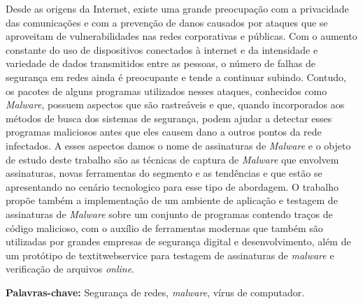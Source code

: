 \documentclass[
	12pt,				%
	openright,			%
	oneside,			%
	a4paper,			%
	english,			%
	french,				%
	spanish,			%
	brazil				%
	]{abntex2}
\begin{document}
\setlength{\absparsep}{18pt} %
\begin{resumo}

Desde as origens da Internet, existe uma grande preocupação com a privacidade das comunicações e com a prevenção de danos causados por ataques que se aproveitam de vulnerabilidades nas redes corporativas e públicas. Com o aumento constante do uso de dispositivos conectados à internet e da intensidade e variedade de dados transmitidos entre as pessoas, o número de falhas de segurança em redes ainda é preocupante e tende a continuar subindo. Contudo, os pacotes de alguns programas utilizados nesses ataques, conhecidos como \textit{Malware}, possuem aspectos que são rastreáveis e que, quando incorporados aos métodos de busca dos sistemas de segurança, podem ajudar a detectar esses programas maliciosos antes que eles causem dano a outros pontos da rede infectados. A esses aspectos damos o nome de assinaturas de \textit{Malware} e o objeto de estudo deste trabalho são as técnicas de captura de \textit{Malware} que envolvem assinaturas, novas ferramentas do segmento e as tendências e que estão se apresentando no cenário tecnologico para esse tipo de abordagem. O trabalho propõe também a implementação de um ambiente de aplicação e testagem de assinaturas de \textit{Malware} sobre um conjunto de programas contendo traços de código malicioso, com o auxílio de ferramentas modernas que também são utilizadas por grandes empresas de segurança digital e desenvolvimento, além de um protótipo de textit{webservice} para testagem de assinaturas de \textit{malware} e verificação de arquivos \textit{online}.

\textbf{Palavras-chave:} Segurança de redes, \textit{malware}, vírus de computador.
\end{resumo}
\end{document}
